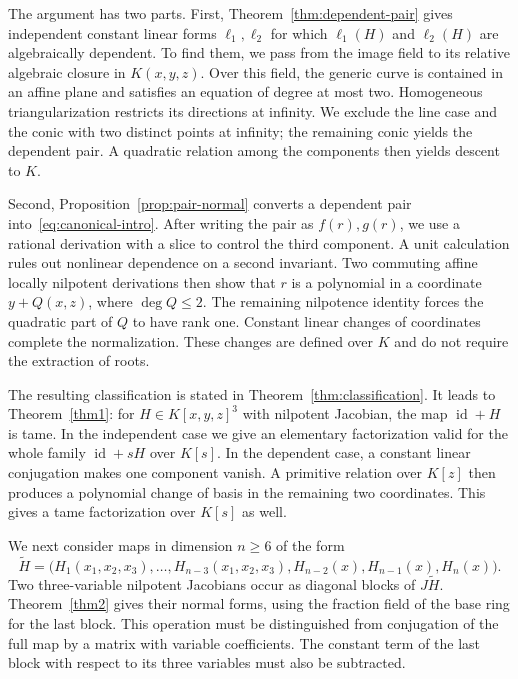 \documentclass[11pt,reqno]{amsart}
\theoremstyle{definition}
\theoremstyle{remark}
\numberwithin{equation}{section}
\DeclareMathOperator{\id}{id}
\begin{document}
The argument has two parts. First, Theorem~\ref{thm:dependent-pair} gives independent constant linear forms $\ell_1,\ell_2$ for which $\ell_1(H)$ and $\ell_2(H)$ are algebraically dependent. To find them, we pass from the image field to its relative algebraic closure in $K(x,y,z)$. Over this field, the generic curve is contained in an affine plane and satisfies an equation of degree at most two. Homogeneous triangularization restricts its directions at infinity. We exclude the line case and the conic with two distinct points at infinity; the remaining conic yields the dependent pair. A quadratic relation among the components then yields descent to $K$.

Second, Proposition~\ref{prop:pair-normal} converts a dependent pair into~\eqref{eq:canonical-intro}. After writing the pair as $f(r),g(r)$, we use a rational derivation with a slice to control the third component. A unit calculation rules out nonlinear dependence on a second invariant. Two commuting affine locally nilpotent derivations then show that $r$ is a polynomial in a coordinate $y+Q(x,z)$, where $\deg Q\leq2$. The remaining nilpotence identity forces the quadratic part of $Q$ to have rank one. Constant linear changes of coordinates complete the normalization. These changes are defined over $K$ and do not require the extraction of roots.

The resulting classification is stated in Theorem~\ref{thm:classification}. It leads to Theorem~\ref{thm1}: for $H\in K[x,y,z]^3$ with nilpotent Jacobian, the map $\id+H$ is tame. In the independent case we give an elementary factorization valid for the whole family $\id+sH$ over $K[s]$. In the dependent case, a constant linear conjugation makes one component vanish. A primitive relation over $K[z]$ then produces a polynomial change of basis in the remaining two coordinates. This gives a tame factorization over $K[s]$ as well.

We next consider maps in dimension $n\geq6$ of the form
\begin{equation}\label{eq:intro-block}
 \widetilde H=\bigl(H_1(x_1,x_2,x_3),\ldots,H_{n-3}(x_1,x_2,x_3),
 H_{n-2}(x),H_{n-1}(x),H_n(x)\bigr).
\end{equation}
Two three-variable nilpotent Jacobians occur as diagonal blocks of $J\widetilde H$. Theorem~\ref{thm2} gives their normal forms, using the fraction field of the base ring for the last block. This operation must be distinguished from conjugation of the full map by a matrix with variable coefficients. The constant term of the last block with respect to its three variables must also be subtracted.
\end{document}
